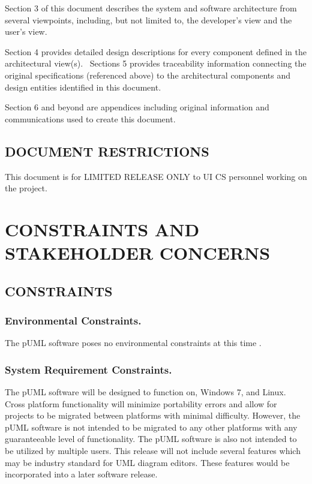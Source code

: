 \documentclass[twoside,letterpaper]{article}
\begin{document}
{{
Section 3 of this document describes the system and software
architecture from several viewpoints, including, but not limited to,
the developer{\textquoteright}s view and the user{\textquoteright}s
view.}

{
Section 4 provides detailed design descriptions for every component
defined in the architectural view(s). \ Sections 5 provides
traceability information connecting the original specifications
(referenced above) to the architectural components and design entities
identified in this document.}

{
Section 6 and beyond are appendices including original information and
communications used to create this document.}

\subsection[DOCUMENT
RESTRICTIONS]{\bfseries DOCUMENT
RESTRICTIONS}

{
This document is for LIMITED RELEASE ONLY to UI CS personnel working on
the project.}




\clearpage

\section{CONSTRAINTS AND STAKEHOLDER CONCERNS}

\subsection{CONSTRAINTS}

\subsubsection{Environmental Constraints.}
{
The pUML software poses no environmental constraints at this time .
}

\subsubsection{System Requirement Constraints.}
{
The pUML software will be designed to function on, Windows 7, and Linux. Cross platform functionality will minimize portability errors and allow for projects to be migrated between platforms with minimal difficulty.  However, the pUML software is not intended to be migrated to any other platforms with any guaranteeable level of functionality. \newline
The pUML software is also not intended to be utilized by multiple users. \newline
This release will not include several features which may be industry standard for UML diagram editors. These features would be incorporated into a later software release.
}

}
\end{document}
